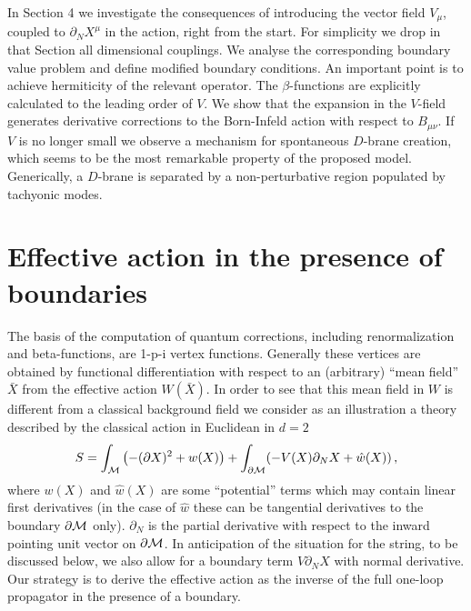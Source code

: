 \documentclass[a4paper,12pt]{article}
\begin{document}
In Section 4 we investigate the consequences of introducing the vector
field $V_\mu$, coupled to $\partial_N X^\mu$ in the action, right
from the start. For simplicity we drop in that Section all dimensional
couplings. We analyse the corresponding boundary value problem
and define modified boundary conditions.
An important point is to achieve
hermiticity of the relevant operator. The $\beta$-functions are
explicitly calculated to the leading order of $V$. We show
that the expansion in the $V$-field generates derivative
corrections to the Born-Infeld action with respect to $B_{\mu\nu}$.
If $V$ is no longer small we observe a mechanism for
spontaneous $D$-brane creation, which seems to be the most remarkable
property of the proposed model. Generically, a $D$-brane is
separated 
by a non-perturbative region populated by
tachyonic modes.

\section{Effective action in the presence of boundaries}
\label{effective}

The basis of the computation of quantum corrections, 
including renormalization and beta-functions, are 1-p-i 
vertex functions. Generally these vertices are obtained by 
functional differentiation with respect to an (arbitrary) 
``mean field'' $\bar X$ from the effective action $W(\bar 
X)$. In order to see that this mean field in $W$ is different from 
a classical background field we consider as an illustration 
a theory described by the classical action in Euclidean in 
$d=2$ 
\begin{equation}
S=\int_{\cal M} \left( -(\partial X)^2 +w(X)\right) +
\int_{\partial {\cal M}}( - V(X)\partial_N X +
\hat w(X) ) \,,\label{Sclassic}
\end{equation}
where $w(X)$ and $\hat w(X)$ are some ``potential'' terms
which may contain linear first derivatives (in the case of $\hat w$ these  can
be tangential derivatives to the boundary $\partial {\cal 
M}$ only).
$\partial_N$ is the partial derivative with respect to
the inward pointing unit vector on $\partial {\cal M}$. 
In anticipation of the situation for the string, to be discussed below, 
we also allow for a 
boundary  term $V\partial_NX$ with  normal derivative.
Our strategy is to derive the effective action as the 
inverse of the full one-loop propagator in the presence of a 
boundary. 
\end{document}
